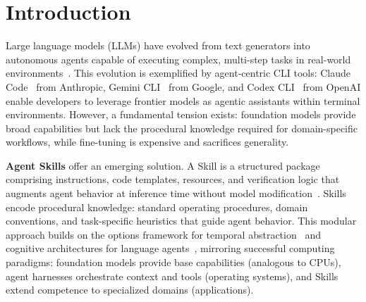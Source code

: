\section{Introduction}
\label{sec:intro}

Large language models (LLMs) have evolved from text generators into autonomous agents capable of executing complex, multi-step tasks in real-world environments~\citep{brown2020languagemodelsfewshotlearners, chowdhery2022palmscalinglanguagemodeling, touvron2023llamaopenefficientfoundation, ouyang2022training, yao2023reactsynergizingreasoningacting}.
This evolution is exemplified by agent-centric CLI tools: Claude Code~\citep{anthropic2025claudecode} from Anthropic, Gemini CLI~\citep{google2025geminicli} from Google, and Codex CLI~\citep{openai2025codexcli} from OpenAI enable developers to leverage frontier models as agentic assistants within terminal environments.
However, a fundamental tension exists: foundation models provide broad capabilities but lack the procedural knowledge required for domain-specific workflows, while fine-tuning is expensive and sacrifices generality.

\textbf{Agent Skills} offer an emerging solution.
A Skill is a structured package comprising instructions, code templates, resources, and verification logic that augments agent behavior at inference time without model modification~\citep{anthropic2025agentskills}.
Skills encode procedural knowledge: standard operating procedures, domain conventions, and task-specific heuristics that guide agent behavior.
This modular approach builds on the options framework for temporal abstraction~\citep{sutton1999between} and cognitive architectures for language agents~\citep{sumers2024cognitive}, mirroring successful computing paradigms: foundation models provide base capabilities (analogous to CPUs), agent harnesses orchestrate context and tools (operating systems), and Skills extend competence to specialized domains (applications).



